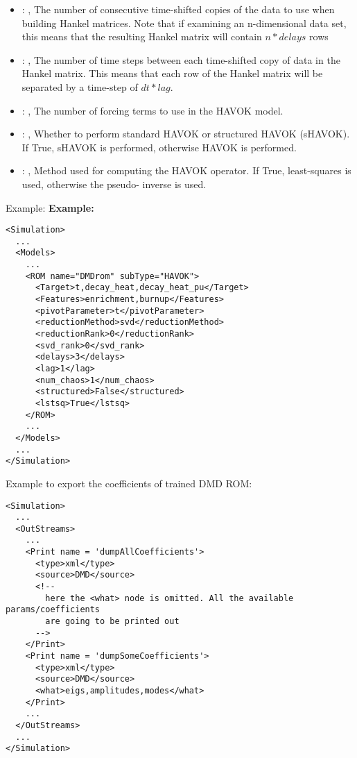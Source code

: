 \begin{itemize}
    \item {}: , 
      The number of consecutive time-shifted copies of the data to use when building Hankel
      matrices.                                                  Note that if examining an
      n-dimensional data set, this means that the resulting Hankel matrix
      will contain $n * delays$ rows

    \item {}: , 
      The number of time steps between each time-shifted copy of data in the Hankel matrix.
      This means that each row of the Hankel matrix will be separated by a time-step of $dt * lag$.

    \item {}: , 
      The number of forcing terms to use in the HAVOK model.

    \item {}: , 
      Whether to perform standard HAVOK or structured HAVOK (sHAVOK).
      If True, sHAVOK is performed, otherwise HAVOK is performed.

    \item {}: , 
      Method used for computing the HAVOK operator.
      If True, least-squares is used, otherwise the pseudo- inverse is used.
  \end{itemize}

\hspace{24pt}
Example:
\textbf{Example:}
\begin{lstlisting}[style=XML,morekeywords={name,subType}]
<Simulation>
  ...
  <Models>
    ...
    <ROM name="DMDrom" subType="HAVOK">
      <Target>t,decay_heat,decay_heat_pu</Target>
      <Features>enrichment,burnup</Features>
      <pivotParameter>t</pivotParameter>
      <reductionMethod>svd</reductionMethod>
      <reductionRank>0</reductionRank>
      <svd_rank>0</svd_rank>
      <delays>3</delays>
      <lag>1</lag>
      <num_chaos>1</num_chaos>
      <structured>False</structured>
      <lstsq>True</lstsq>
    </ROM>
    ...
  </Models>
  ...
</Simulation>
\end{lstlisting}

Example to export the coefficients of trained DMD ROM:
\begin{lstlisting}[style=XML,morekeywords={name,subType}]
<Simulation>
  ...
  <OutStreams>
    ...
    <Print name = 'dumpAllCoefficients'>
      <type>xml</type>
      <source>DMD</source>
      <!--
        here the <what> node is omitted. All the available params/coefficients
        are going to be printed out
      -->
    </Print>
    <Print name = 'dumpSomeCoefficients'>
      <type>xml</type>
      <source>DMD</source>
      <what>eigs,amplitudes,modes</what>
    </Print>
    ...
  </OutStreams>
  ...
</Simulation>
\end{lstlisting}


